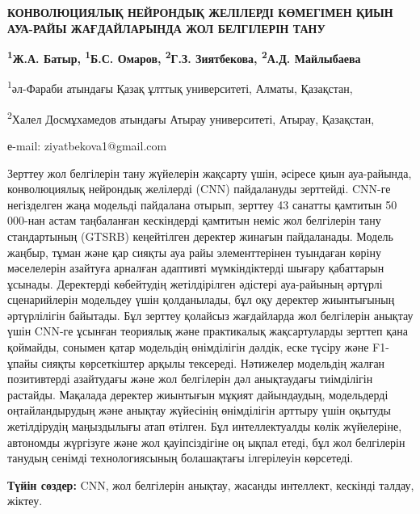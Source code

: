 \begin{center}
{\large\bfseries КОНВОЛЮЦИЯЛЫҚ НЕЙРОНДЫҚ ЖЕЛІЛЕРДІ КӨМЕГІМЕН ҚИЫН АУА-РАЙЫ
ЖАҒДАЙЛАРЫНДА ЖОЛ БЕЛГІЛЕРІН ТАНУ}

{\bfseries \textsuperscript{1}Ж.А. Батыр, \textsuperscript{1}Б.С. Омаров,
\textsuperscript{2}Г.З. Зиятбекова, \textsuperscript{2}А.Д. Майлыбаева}

\textsuperscript{1}әл-Фараби атындағы Қазақ ұлттық университеті, Алматы,
Қазақстан,

\textsuperscript{2}Халел Досмұхамедов атындағы Атырау университеті,
Атырау, Қазақстан,

е-mail: ziyatbekova1@gmail.com
\end{center}

Зерттеу жол белгілерін тану жүйелерін жақсарту үшін, әсіресе қиын
ауа-райында, конволюциялық нейрондық желілерді (CNN) пайдалануды
зерттейді. CNN-ге негізделген жаңа модельді пайдалана отырып, зерттеу 43
санатты қамтитын 50 000-нан астам таңбаланған кескіндерді қамтитын неміс
жол белгілерін тану стандартының (GTSRB) кеңейтілген деректер жинағын
пайдаланады. Модель жаңбыр, тұман және қар сияқты ауа райы
элементтерінен туындаған көріну мәселелерін азайтуға арналған адаптивті
мүмкіндіктерді шығару қабаттарын ұсынады. Деректерді көбейтудің
жетілдірілген әдістері ауа-райының әртүрлі сценарийлерін модельдеу үшін
қолданылады, бұл оқу деректер жиынтығының әртүрлілігін байытады. Бұл
зерттеу қолайсыз жағдайларда жол белгілерін анықтау үшін CNN-ге ұсынған
теориялық және практикалық жақсартуларды зерттеп қана қоймайды, сонымен
қатар модельдің өнімділігін дәлдік, еске түсіру және F1-ұпайы сияқты
көрсеткіштер арқылы тексереді. Нәтижелер модельдің жалған позитивтерді
азайтудағы және жол белгілерін дәл анықтаудағы тиімділігін растайды.
Мақалада деректер жиынтығын мұқият дайындаудың, модельдерді
оңтайландырудың және анықтау жүйесінің өнімділігін арттыру үшін оқытуды
жетілдірудің маңыздылығы атап өтілген. Бұл интеллектуалды көлік
жүйелеріне, автономды жүргізуге және жол қауіпсіздігіне оң ықпал етеді,
бұл жол белгілерін танудың сенімді технологиясының болашақтағы
ілгерілеуін көрсетеді.

{\bfseries Түйін сөздер:} CNN, жол белгілерін анықтау, жасанды интеллект,
кескінді талдау, жіктеу.


